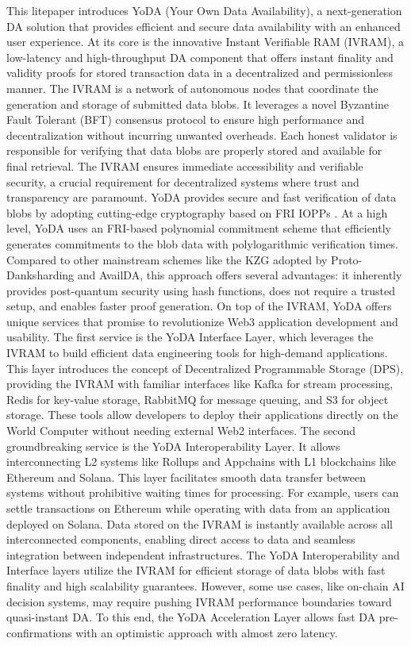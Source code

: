 \documentclass[11pt]{article}
\begin{document}
This litepaper introduces YoDA (Your Own Data Availability), a next-generation DA solution that provides efficient and secure data availability with an enhanced user experience. At its core is the innovative Instant Verifiable RAM (IVRAM), a low-latency and high-throughput DA component that offers instant finality and validity proofs for stored transaction data in a decentralized and permissionless manner. The IVRAM is a network of autonomous nodes that coordinate the generation and storage of submitted data blobs. It leverages a novel Byzantine Fault Tolerant (BFT) consensus protocol to ensure high performance and decentralization without incurring unwanted overheads. Each honest validator is responsible for verifying that data blobs are properly stored and available for final retrieval. The IVRAM ensures immediate accessibility and verifiable security, a crucial requirement for decentralized systems where trust and transparency are paramount.
%
YoDA provides secure and fast verification of data blobs by adopting cutting-edge cryptography based on FRI IOPPs \cite{bensasson18, hasw:2024/248}. At a high level, YoDA uses an FRI-based polynomial commitment scheme that efficiently generates commitments to the blob data with polylogarithmic verification times. Compared to other mainstream schemes like the KZG adopted by Proto-Danksharding and AvailDA, this approach offers several advantages: it inherently provides post-quantum security using hash functions, does not require a trusted setup, and enables faster proof generation.
%
On top of the IVRAM, YoDA offers unique services that promise to revolutionize Web3 application development and usability. The first service is the YoDA Interface Layer, which leverages the IVRAM to build efficient data engineering tools for high-demand applications. This layer introduces the concept of Decentralized Programmable Storage (DPS), providing the IVRAM with familiar interfaces like Kafka for stream processing, Redis for key-value storage, RabbitMQ for message queuing, and S3 for object storage. These tools allow developers to deploy their applications directly on the World Computer without needing external Web2 interfaces.
%
The second groundbreaking service is the YoDA Interoperability Layer. It allows interconnecting L2 systems like Rollups and Appchains with L1 blockchains like Ethereum and Solana. This layer facilitates smooth data transfer between systems without prohibitive waiting times for processing. For example, users can settle transactions on Ethereum while operating with data from an application deployed on Solana. Data stored on the IVRAM is instantly available across all interconnected components, enabling direct access to data and seamless integration between independent infrastructures.
%
The YoDA Interoperability and Interface layers utilize the IVRAM for efficient storage of data blobs with fast finality and high scalability guarantees. However, some use cases, like on-chain AI decision systems, may require pushing IVRAM performance boundaries toward quasi-instant DA. To this end, the YoDA Acceleration Layer allows fast DA pre-confirmations with an optimistic approach with almost zero latency.
\end{document}
